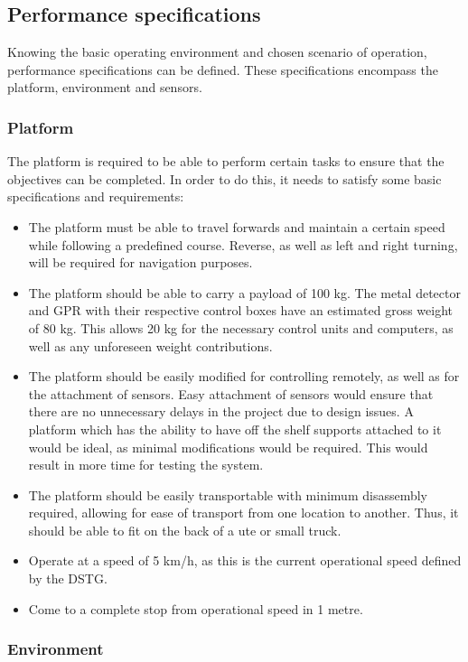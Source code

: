 \documentclass[main.tex]{subfiles}
\begin{document}
\subsection{Performance specifications}
Knowing the basic operating environment and chosen scenario of operation, performance specifications can be defined. These specifications encompass the platform, environment and sensors.
\subsubsection{Platform}
The platform is required to be able to perform certain tasks to ensure that the objectives can be completed. In order to do this, it needs to satisfy some basic specifications and requirements: 
\begin{itemize}
\item The platform must be able to travel forwards and maintain a certain speed while following a predefined course. Reverse, as well as left and right turning, will be required for navigation purposes.
 \item The platform should be able to carry a payload of 100 kg. The metal detector and GPR with their respective control boxes have an estimated gross weight of 80 kg. This allows 20 kg for the necessary control units and computers, as well as any unforeseen weight contributions. 
\item The platform should be easily modified for controlling remotely, as well as for the attachment of sensors. Easy attachment of sensors would ensure that there are no unnecessary delays in the project due to design issues. A platform which has the ability to have off the shelf supports attached to it would be ideal, as minimal modifications would be required. This would result in more time for testing the system. 
\item The platform should be easily transportable with minimum disassembly required, allowing for ease of transport from one location to another. Thus, it should be able to fit on the back of a ute or small truck.
\item Operate at a speed of 5 km/h, as this is the current operational speed defined by the DSTG.
\item Come to a complete stop from operational speed in 1 metre.
\end{itemize}
\subsubsection{Environment}
\end{document}
